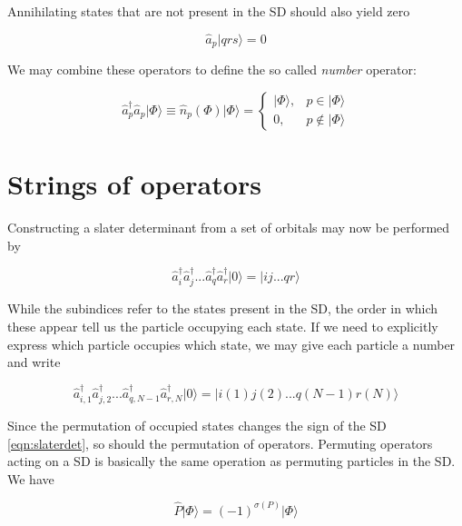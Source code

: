 Annihilating states that are not present in the SD should also yield zero

\begin{equation}
\hat{a}_p \vert qrs \rangle = 0
\label{eqn:annihilateExclusion}
\end{equation}

We may combine these operators to define the so called \emph{number} operator:

\begin{equation}
\hat{a}_p^\dagger \hat{a}_p \vert \Phi \rangle \equiv  \hat{n}_p(\Phi) \vert \Phi \rangle =
\begin{cases}
\vert \Phi \rangle,& p \in \vert \Phi \rangle \\
0,& p \not \in \vert \Phi \rangle
\end{cases}
\label{eqn:numberop}
\end{equation}

\section{Strings of operators}

Constructing a slater determinant from a set of orbitals may now be performed by 

\begin{equation}
\hat{a}_i^\dagger \hat{a}_j^\dagger  ... \hat{a}_q^\dagger \hat{a}_r^\dagger \vert 0 \rangle = \vert ij ... qr \rangle
\label{eqn:createSD}
\end{equation}

While the subindices refer to the states present in the SD, the order in which these appear tell us the particle occupying each state. If we need to explicitly express which particle occupies which state, we may give each particle a number and write

\begin{equation}
\hat{a}_{i,1}^\dagger \hat{a}_{j,2}^\dagger  ... \hat{a}_{q,N-1}^\dagger \hat{a}_{r,N}^\dagger \vert 0 \rangle = \vert i(1)j(2) ... q(N-1)r(N) \rangle
\label{eqn:createSD2}
\end{equation}

Since the permutation of occupied states changes the sign of the SD \ref{eqn:slaterdet}, so should the permutation of operators. Permuting operators acting on a SD is basically the same operation as permuting particles in the SD. We have 

\begin{equation}
\hat{P} \vert \Phi \rangle = (-1)^{\sigma(P)} \vert \Phi \rangle
\label{eqn:Permute2nquant}
\end{equation}

